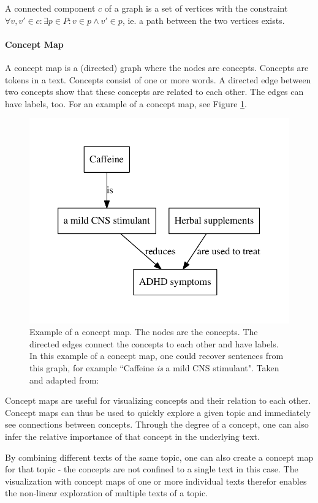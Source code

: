 A connected component $c$ of a graph is a set of vertices with the constraint $\forall v, v' \in c: \exists p \in P: v \in p \land v' \in p$, ie. a path between the two vertices exists.



\paragraph{Concept Map}
A concept map is a (directed) graph where the nodes are concepts.
Concepts are tokens in a text.
Concepts consist of one or more words.
A directed edge between two concepts show that these concepts are related to each other. The edges can have labels, too.
For an example of a concept map, see Figure \ref{fig:concept_map}.

\begin{figure}[h]
\centering
\includegraphics[width=0.5\linewidth]{assets/figures/concept_map.pdf}
\caption{Example of a concept map. The nodes are the concepts. The directed edges connect the concepts to each other and have labels. In this example of a concept map, one could recover sentences from this graph, for example ``Caffeine \textit{is} a mild CNS stimulant". Taken and adapted from: \cite{Falke2017}}
\label{fig:concept_map}
\end{figure}

Concept maps are useful for visualizing concepts and their relation to each other.
Concept maps can thus be used to quickly explore a given topic and immediately see connections between concepts.
Through the degree of a concept, one can also infer the relative importance of that concept in the underlying text.

By combining different texts of the same topic, one can also create a concept map for that topic - the concepts are not confined to a single text in this case.
The visualization with concept maps of one or more individual texts therefor enables the non-linear exploration of multiple texts of a topic.

